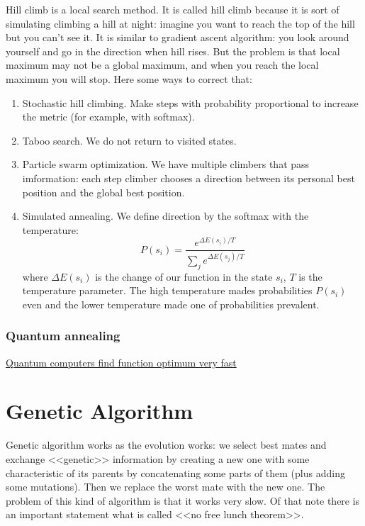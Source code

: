 Hill climb is a local search method. It is called hill climb because it is sort of simulating climbing a hill at night: imagine you want to reach the top of the hill but you can't see it. It is similar to gradient ascent algorithm: you look around yourself and go in the direction when hill rises. But the problem is that local maximum may not be a global maximum, and when you reach the local maximum you will stop. Here some ways to correct that:
\begin{enumerate}[label=$\bullet$]
	\item {\sc Stochastic hill climbing.} Make steps with probability proportional to increase the metric (for example, with softmax).
	\item {\sc Taboo search.} We do not return to visited states.
	\item {\sc Particle swarm optimization.} We have multiple climbers that pass imformation: each step climber chooses a direction between its personal best position and the global best position.
	\item {\sc Simulated annealing.} We define direction by the softmax with the temperature:
	$$P(s_i)=\frac{e^{\Delta E(s_i)/T}}{\sum\limits_{j} e^{\Delta E(s_j)/T}}$$
	where $\Delta E(s_i)$ is the change of our function in the state $s_i$, $T$ is the temperature parameter. The high temperature mades probabilities $P(s_i)$ even and the lower temperature made one of probabilities prevalent.
\end{enumerate}

\subsubsection*{Quantum annealing}

\href{https://docs.dwavesys.com/docs/latest/c_gs_2.html}{Quantum computers find function optimum very fast}

\section{Genetic Algorithm}

Genetic algorithm works as the evolution works: we select best mates and exchange <<genetic>> information by creating a new one with some characteristic of its parents by concatenating some parts of them (plus adding some mutations). Then we replace the worst mate with the new one. The problem of this kind of algorithm is that it works very slow. Of that note there is an important statement what is called <<no free lunch theorem>>.


